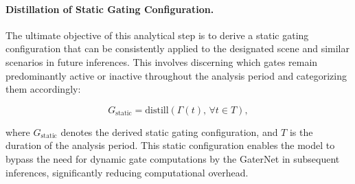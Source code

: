 \paragraph{Distillation of Static Gating Configuration.} The ultimate objective of this analytical step is to derive a static gating configuration that can be consistently applied to the designated scene and similar scenarios in future inferences. This involves discerning which gates remain predominantly active or inactive throughout the analysis period and categorizing them accordingly:

\begin{equation}
G_{\text{static}} = \text{distill}(\Gamma(t), \, \forall t \in T),
\label{eq:static_gating_configuration}
\end{equation}

where \(G_{\text{static}}\) denotes the derived static gating configuration, and \(T\) is the duration of the analysis period. This static configuration enables the model to bypass the need for dynamic gate computations by the GaterNet in subsequent inferences, significantly reducing computational overhead.

\clearpage

